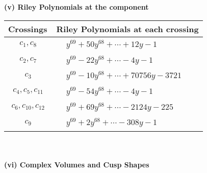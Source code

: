 \documentclass[1p]{elsarticle_modified}
\theoremstyle{definition}
\begin{document}
\newpage\renewcommand{\arraystretch}{1}
\flushleft \textbf{(v) Riley Polynomials at the component}\newline \\
\begin{tabular}{m{50pt}|m{274pt}}
Crossings & \hspace{64pt}Riley Polynomials at each crossing \\
\hline $$\begin{aligned}c_{1},c_{8}\end{aligned}$$&$\begin{aligned}
&y^{69}+50 y^{68}+\cdots+12 y-1
\end{aligned}$\\
\hline $$\begin{aligned}c_{2},c_{7}\end{aligned}$$&$\begin{aligned}
&y^{69}-22 y^{68}+\cdots-4 y-1
\end{aligned}$\\
\hline $$\begin{aligned}c_{3}\end{aligned}$$&$\begin{aligned}
&y^{69}-10 y^{68}+\cdots+70756 y-3721
\end{aligned}$\\
\hline $$\begin{aligned}c_{4},c_{5},c_{11}\end{aligned}$$&$\begin{aligned}
&y^{69}-54 y^{68}+\cdots-4 y-1
\end{aligned}$\\
\hline $$\begin{aligned}c_{6},c_{10},c_{12}\end{aligned}$$&$\begin{aligned}
&y^{69}+69 y^{68}+\cdots-2124 y-225
\end{aligned}$\\
\hline $$\begin{aligned}c_{9}\end{aligned}$$&$\begin{aligned}
&y^{69}+2 y^{68}+\cdots-308 y-1
\end{aligned}$\\
\hline
\end{tabular}\\~\\
\newpage\flushleft \textbf{(vi) Complex Volumes and Cusp Shapes}
\end{document}
